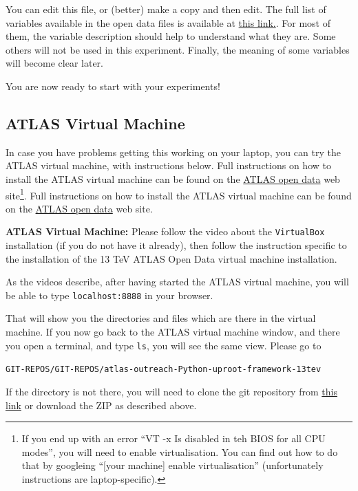 You can edit this file, or (better) make a copy and then edit. The full list of variables available in the open data files is available at \href{http://opendata.atlas.cern/release/2020/documentation/datasets/dataset13.html}{this link.}. For most of them, the variable description should help to understand what they are. Some others will not be used in this experiment. Finally, the meaning of some variables will become clear later. 

You are now ready to start with your experiments!


\subsection{ATLAS Virtual Machine}

 In case you have problems getting this working on your laptop, you can try the ATLAS virtual machine, with instructions below. Full instructions on how to install the ATLAS virtual machine can be found on the \href{http://atlas.cern/resources/opendata}{ATLAS open data} web site\footnote{If you end up with an error ``VT -x Is disabled in teh BIOS for all CPU modes'',  you will need to enable virtualisation. You can find out how to do that by googleing ``[your machine] enable virtualisation'' (unfortunately instructions are laptop-specific).}. Full instructions on how to install the ATLAS virtual machine can be found on the \href{http://atlas.cern/resources/opendata}{ATLAS open data} web site. 

\begin{remark}
\textbf{ATLAS Virtual Machine:} Please follow the video about the \verb|VirtualBox| installation (if you do not have it already), then follow the instruction specific to the installation of the 13 TeV ATLAS Open Data virtual machine installation. 
\end{remark}

As the videos describe, after having started the ATLAS virtual machine, you will be able to type \verb|localhost:8888| in your browser. 

That will show you the directories and files which are there in the virtual machine. If you now go back to the ATLAS virtual machine window, and there you open a terminal, and type \verb|ls|, you will see the same view. Please go to 

\verb|GIT-REPOS/GIT-REPOS/atlas-outreach-Python-uproot-framework-13tev|

If the directory is not there, you will need to clone the git repository from \href{https://github.com/atlas-outreach-data-tools/atlas-outreach-Python-uproot-framework-13tev}{this link} or download the ZIP as described above. 



